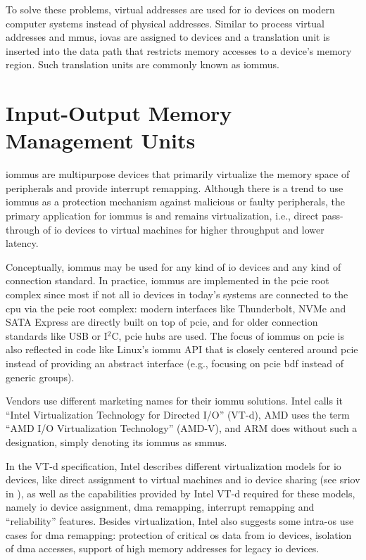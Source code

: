 To solve these problems, virtual addresses are used for \ac{io} devices on
modern computer systems instead of physical addresses. Similar to process
virtual addresses and \acp{mmu}, \acp{iova} are assigned to devices and a
translation unit is inserted into the data path that restricts memory accesses
to a device's memory region. Such translation units are commonly known as
\acfp{iommu}.


\section{Input-Output Memory Management Units}
\label{sec:iommus}

\acp{iommu} are multipurpose devices that primarily virtualize the memory space
of peripherals and provide interrupt remapping. Although there is a trend to use
\acp{iommu} as a protection mechanism against malicious or faulty peripherals,
the primary application for \acp{iommu} is and remains virtualization, i.e.,
direct pass-through of \ac{io} devices to virtual machines for higher throughput
and lower latency.

Conceptually, \acp{iommu} may be used for any kind of \ac{io} devices and any
kind of connection standard. In practice, \acp{iommu} are implemented in the
\ac{pcie} root complex since most if not all \ac{io} devices in today's systems
are connected to the \ac{cpu} via the \ac{pcie} root complex: modern interfaces
like Thunderbolt, NVMe and SATA Express are directly built on top of \ac{pcie},
and for older connection standards like USB or I$^2$C, \ac{pcie} hubs are used.
The focus of \acp{iommu} on \ac{pcie} is also reflected in code like Linux's
\ac{iommu} API that is closely centered around \ac{pcie} instead of providing an
abstract interface (e.g., focusing on \ac{pcie} \ac{bdf} instead of generic
groups).

Vendors use different marketing names for their \ac{iommu} solutions. Intel
calls it ``Intel Virtualization Technology for Directed I/O'' (VT-d), AMD uses
the term ``AMD I/O Virtualization Technology'' (AMD-V), and ARM does without
such a designation, simply denoting its \acp{iommu} as \acp{smmu}.

In the VT-d specification, Intel describes different virtualization models for
\ac{io} devices, like direct assignment to virtual machines and \ac{io} device
sharing (see \ac{sriov} in ), as well as the capabilities
provided by Intel VT-d required for these models, namely \ac{io} device
assignment, \ac{dma} remapping, interrupt remapping and ``reliability''
features. Besides virtualization, Intel also suggests some intra-\ac{os} use
cases for \ac{dma} remapping: protection of critical \ac{os} data from \ac{io}
devices, isolation of \ac{dma} accesses, support of high memory addresses for
legacy \ac{io} devices.

